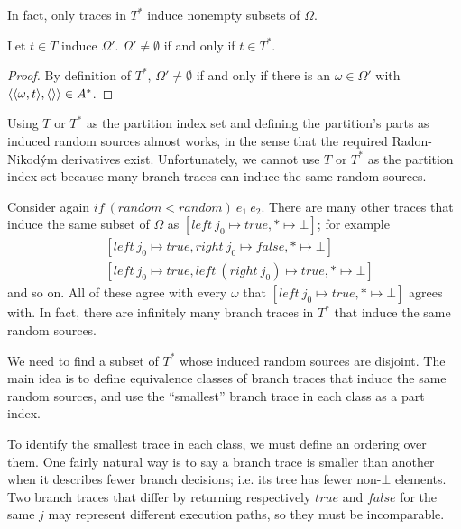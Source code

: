 In fact, only traces in $T^*$ induce nonempty subsets of $\Omega$.

\begin{theorem}
\label{thm:t-max-induce-nonempty}
Let $t \in T$ induce $\Omega'$. $\Omega' \neq \emptyset$ if and only if $t \in T^*$.
\end{theorem}
\begin{proof}
By definition of $T^*$, $\Omega' \neq \emptyset$ if and only if there is an $\omega \in \Omega'$ with $\langle{\langle{\omega,t}\rangle,\langle{}\rangle}\rangle \in  A^*$.
\end{proof}

Using $T$ or $T^*$ as the partition index set and defining the partition's parts as induced random sources almost works, in the sense that the required Radon-Nikod\'ym derivatives exist.
Unfortunately, we cannot use $T$ or $T^*$ as the partition index set because many branch traces can induce the same random sources.

\begin{example}
Consider again $if~(random < random)~\mathit{e_1}~\mathit{e_2}$.
There are many other traces that induce the same subset of $\Omega$ as $[left~j_0 \mapsto true, * \mapsto \bot]$; for example
\begin{equation}
\begin{aligned}
	&[left~j_0 \mapsto true, right~j_0 \mapsto false, * \mapsto \bot] \\
	&[left~j_0 \mapsto true, left~(right~j_0) \mapsto true, * \mapsto \bot]
\end{aligned}
\end{equation}
and so on.
All of these agree with every $\omega$ that $[left~j_0 \mapsto true, * \mapsto \bot]$ agrees with.
In fact, there are infinitely many branch traces in $T^*$ that induce the same random sources.
\exampleqed
\end{example}

We need to find a subset of $T^*$ whose induced random sources are disjoint.
The main idea is to define equivalence classes of branch traces that induce the same random sources, and use the ``smallest'' branch trace in each class as a part index.

To identify the smallest trace in each class, we must define an ordering over them.
One fairly natural way is to say a branch trace is smaller than another when it describes fewer branch decisions; i.e. its tree has fewer non-$\bot$ elements.
Two branch traces that differ by returning respectively $true$ and $false$ for the same $j$ may represent different execution paths, so they must be incomparable.

